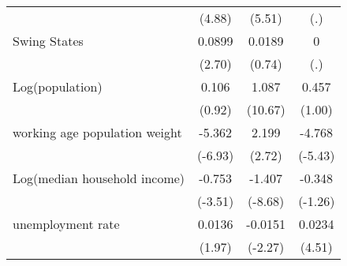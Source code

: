 \begin{tabular}{l*{3}{c}}
                                  & (4.88)                                              & (5.51)                                              & (.)                                                 \\
    [1em]
    Swing States                  & 0.0899\sym{**}                                      & 0.0189                                              & 0                                                   \\
                                  & (2.70)                                              & (0.74)                                              & (.)                                                 \\
    [1em]
    Log(population)               & 0.106                                               & 1.087\sym{***}                                      & 0.457                                               \\
                                  & (0.92)                                              & (10.67)                                             & (1.00)                                              \\
    [1em]
    working age population weight & -5.362\sym{***}                                     & 2.199\sym{**}                                       & -4.768\sym{***}                                     \\
                                  & (-6.93)                                             & (2.72)                                              & (-5.43)                                             \\
    [1em]
    Log(median household income)  & -0.753\sym{***}                                     & -1.407\sym{***}                                     & -0.348                                              \\
                                  & (-3.51)                                             & (-8.68)                                             & (-1.26)                                             \\
    [1em]
    unemployment rate             & 0.0136\sym{*}                                       & -0.0151\sym{*}                                      & 0.0234\sym{***}                                     \\
                                  & (1.97)                                              & (-2.27)                                             & (4.51)                                              \\

\end{tabular}
